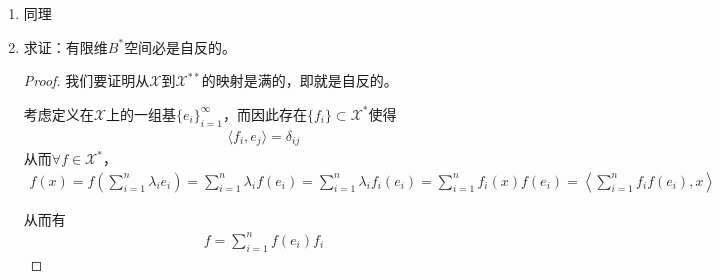 \begin{enumerate}[leftmargin=2cm, label=\arabic*]
    \begin{proof}
        注意对于$\forall x\in C$，$x = \{\xi_k\}$，考虑$\lim\limits_{k\to\infty} \xi_k = \xi_0$，则
        \begin{align*}
            x = \xi_0 e_0 + \sum\limits_{k=1}^{\infty} (\xi_k - \xi_0) e_k
        \end{align*}
        其中
        \begin{align*}
            e_0 &= (1,1,1,\cdots, 1,\cdots,1); \\
            e_k &= (\underbrace{0,0,\cdots,1}\limits_{k},0,\cdots, 0).
        \end{align*}
        对于$\forall f\in C^*$，记
        \begin{align*}
            f(x) &= \xi_0 f(e_0) + \sum\limits_{k=1}^{\infty} (\xi_k - \xi_0) f(e_k) \\
            \Tilde{\eta}_0 &= f(e_0) \\
            \Tilde{\eta}_k &= f(e_k) 
        \end{align*}
        则有
        \begin{align*}
            f(x) = \xi_0 \Tilde{\eta}_0 + \sum\limits_{k=1}^{\infty} (\xi_k - \xi_0)\Tilde{\eta}_k
        \end{align*}
        而后证明这两个范数相等即可。
    \end{proof} 

    \item 同理

    \item 求证：有限维$B^*$空间必是自反的。
    \begin{proof}
        我们要证明从$\mathscr{X}$到$\mathscr{X}^{**}$的映射是满的，即就是自反的。

        考虑定义在$\mathscr{X}$上的一组基$\{e_i\}_{i=1}^{\infty}$，而因此存在$\{f_i\}\subset\mathscr{X}^*$使得
        \begin{align*}
            \langle f_i, e_j\rangle = \delta_{ij}
        \end{align*}
        从而$\forall f\in\mathscr{X}^*$，
        \begin{align*}
            f(x) = f\left(\sum\limits_{i=1}^n \lambda_i e_i\right) = \sum\limits_{i=1}^n \lambda_i f(e_i) = \sum\limits_{i=1}^n \lambda_i f_i(e_i) = \sum\limits_{i=1}^n f_i(x) f(e_i) = \left\langle \sum\limits_{i=1}^n f_i f(e_i) , x\right\rangle
        \end{align*}

        从而有
        \begin{align*}
            f = \sum\limits_{i=1}^n  f(e_i)f_i
        \end{align*}


\end{proof}
\end{enumerate}
